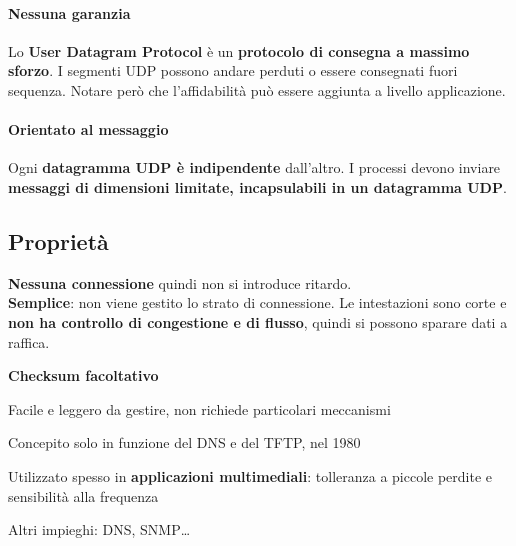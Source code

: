 \documentclass[10pt]{article}
\begin{document}
\paragraph{Nessuna garanzia} Lo \textbf{User Datagram Protocol} è un \textbf{protocolo di consegna a massimo sforzo}. I segmenti UDP possono andare perduti o essere consegnati fuori sequenza. Notare però che l'affidabilità può essere aggiunta a livello applicazione.
\paragraph{Orientato al messaggio} Ogni \textbf{datagramma UDP è indipendente} dall'altro. I processi devono inviare \textbf{messaggi di dimensioni limitate, incapsulabili in un datagramma UDP}.
\subsection{Proprietà}
\begin{list}{}{}
\item \textbf{Nessuna connessione} quindi non si introduce ritardo.\\\textbf{Semplice}: non viene gestito lo strato di connessione. Le intestazioni sono corte e \textbf{non ha controllo di congestione e di flusso}, quindi si possono sparare dati a raffica.
\item \textbf{Checksum facoltativo}
\item Facile e leggero da gestire, non richiede particolari meccanismi
\item Concepito solo in funzione del DNS e del TFTP, nel 1980
\item Utilizzato spesso in \textbf{applicazioni multimediali}: tolleranza a piccole perdite e sensibilità alla frequenza
\item Altri impieghi: DNS, SNMP\ldots
\end{list}
\pagebreak
\end{document}
